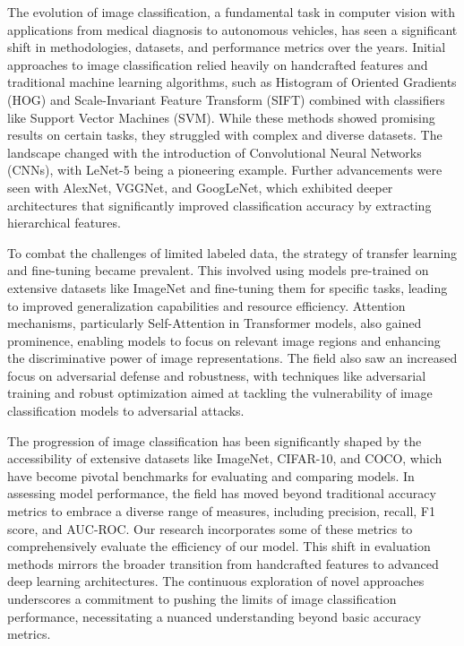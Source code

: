 \documentclass[sigconf,authordraft]{acmart}
\begin{document}
\noindent
The evolution of image classification, a fundamental task in computer vision with applications from medical diagnosis to autonomous vehicles\cite{23}, has seen a significant shift in methodologies, datasets, and performance metrics over the years. Initial approaches to image classification relied heavily on handcrafted features and traditional machine learning algorithms, such as Histogram of Oriented Gradients (HOG)\cite{5} and Scale-Invariant Feature Transform (SIFT) combined with classifiers like Support Vector Machines (SVM). While these methods showed promising results on certain tasks, they struggled with complex and diverse datasets. The landscape changed with the introduction of Convolutional Neural Networks (CNNs), with LeNet-5 being a pioneering example. Further advancements were seen with AlexNet\cite{7}, VGGNet\cite{8}, and GoogLeNet\cite{9}, which exhibited deeper architectures that significantly improved classification accuracy by extracting hierarchical features.

\noindent 
To combat the challenges of limited labeled data, the strategy of transfer learning and fine-tuning became prevalent. This involved using models pre-trained on extensive datasets like ImageNet\cite{15} and fine-tuning them for specific tasks, leading to improved generalization capabilities and resource efficiency\cite{24}. Attention mechanisms, particularly Self-Attention in Transformer models\cite{12}, also gained prominence, enabling models to focus on relevant image regions and enhancing the discriminative power of image representations. The field also saw an increased focus on adversarial defense and robustness, with techniques like adversarial training\cite{25} and robust optimization aimed at tackling the vulnerability of image classification models to adversarial attacks.

\noindent 
The progression of image classification has been significantly shaped by the accessibility of extensive datasets like ImageNet, CIFAR-10, and COCO, which have become pivotal benchmarks for evaluating and comparing models. In assessing model performance, the field has moved beyond traditional accuracy metrics to embrace a diverse range of measures, including precision, recall, F1 score, and AUC-ROC. Our research incorporates some of these metrics to comprehensively evaluate the efficiency of our model. This shift in evaluation methods mirrors the broader transition from handcrafted features to advanced deep learning architectures. The continuous exploration of novel approaches underscores a commitment to pushing the limits of image classification performance, necessitating a nuanced understanding beyond basic accuracy metrics.
\end{document}
